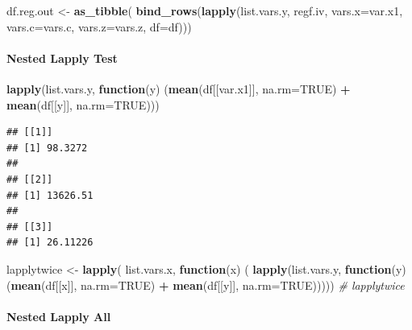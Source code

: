 \documentclass[
]{book}
\newenvironment{Shaded}{\begin{snugshade}}{\end{snugshade}}
\newcommand{\CommentTok}[1]{\textcolor[rgb]{0.56,0.35,0.01}{\textit{#1}}}
\newcommand{\ControlFlowTok}[1]{\textcolor[rgb]{0.13,0.29,0.53}{\textbf{#1}}}
\newcommand{\DataTypeTok}[1]{\textcolor[rgb]{0.13,0.29,0.53}{#1}}
\newcommand{\KeywordTok}[1]{\textcolor[rgb]{0.13,0.29,0.53}{\textbf{#1}}}
\newcommand{\NormalTok}[1]{#1}
\newcommand{\OperatorTok}[1]{\textcolor[rgb]{0.81,0.36,0.00}{\textbf{#1}}}
\newcommand{\OtherTok}[1]{\textcolor[rgb]{0.56,0.35,0.01}{#1}}
\newcommand{\StringTok}[1]{\textcolor[rgb]{0.31,0.60,0.02}{#1}}
\begin{document}
\begin{Shaded}
\begin{Highlighting}[]
\NormalTok{df.reg.out \textless{}{-}}\StringTok{ }\KeywordTok{as\_tibble}\NormalTok{(}
  \KeywordTok{bind\_rows}\NormalTok{(}\KeywordTok{lapply}\NormalTok{(list.vars.y, regf.iv,}
                   \DataTypeTok{vars.x=}\NormalTok{var.x1, }\DataTypeTok{vars.c=}\NormalTok{vars.c, }\DataTypeTok{vars.z=}\NormalTok{vars.z, }\DataTypeTok{df=}\NormalTok{df)))}
\end{Highlighting}
\end{Shaded}

\hypertarget{nested-lapply-test}{%
\paragraph{Nested Lapply Test}\label{nested-lapply-test}}

\begin{Shaded}
\begin{Highlighting}[]
\KeywordTok{lapply}\NormalTok{(list.vars.y, }\ControlFlowTok{function}\NormalTok{(y) (}\KeywordTok{mean}\NormalTok{(df[[var.x1]], }\DataTypeTok{na.rm=}\OtherTok{TRUE}\NormalTok{) }\OperatorTok{+}
\StringTok{                                   }\KeywordTok{mean}\NormalTok{(df[[y]], }\DataTypeTok{na.rm=}\OtherTok{TRUE}\NormalTok{)))}
\end{Highlighting}
\end{Shaded}

\begin{verbatim}
## [[1]]
## [1] 98.3272
## 
## [[2]]
## [1] 13626.51
## 
## [[3]]
## [1] 26.11226
\end{verbatim}

\begin{Shaded}
\begin{Highlighting}[]
\NormalTok{lapplytwice \textless{}{-}}\StringTok{ }\KeywordTok{lapply}\NormalTok{(}
\NormalTok{  list.vars.x, }\ControlFlowTok{function}\NormalTok{(x) (}
    \KeywordTok{lapply}\NormalTok{(list.vars.y, }\ControlFlowTok{function}\NormalTok{(y) (}\KeywordTok{mean}\NormalTok{(df[[x]], }\DataTypeTok{na.rm=}\OtherTok{TRUE}\NormalTok{) }\OperatorTok{+}
\StringTok{                                       }\KeywordTok{mean}\NormalTok{(df[[y]], }\DataTypeTok{na.rm=}\OtherTok{TRUE}\NormalTok{)))))}
\CommentTok{\# lapplytwice}
\end{Highlighting}
\end{Shaded}

\hypertarget{nested-lapply-all}{%
\paragraph{Nested Lapply All}\label{nested-lapply-all}}
\end{document}
